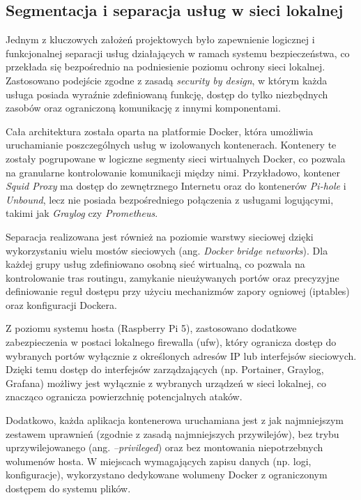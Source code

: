 \documentclass[
    left=2.5cm,         %
    right=2.5cm,        %
    top=2.5cm,          %
    bottom=3cm,         %
    bindingoffset=6mm,  %
    nohyphenation=true %
]{eiti/eiti-thesis} %
\begin{document}
\subsection{Segmentacja i separacja usług w sieci lokalnej}

Jednym z kluczowych założeń projektowych było zapewnienie logicznej i funkcjonalnej separacji usług działających w ramach systemu bezpieczeństwa, co przekłada się bezpośrednio na podniesienie poziomu ochrony sieci lokalnej. Zastosowano podejście zgodne z zasadą \textit{security by design}, w którym każda usługa posiada wyraźnie zdefiniowaną funkcję, dostęp do tylko niezbędnych zasobów oraz ograniczoną komunikację z innymi komponentami.

Cała architektura została oparta na platformie Docker\cite{docker-docs}, która umożliwia uruchamianie poszczególnych usług w izolowanych kontenerach. Kontenery te zostały pogrupowane w logiczne segmenty sieci wirtualnych Docker, co pozwala na granularne kontrolowanie komunikacji między nimi. Przykładowo, kontener \textit{Squid Proxy} ma dostęp do zewnętrznego Internetu oraz do kontenerów \textit{Pi-hole} i \textit{Unbound}, lecz nie posiada bezpośredniego połączenia z usługami logującymi, takimi jak \textit{Graylog} czy \textit{Prometheus}.

Separacja realizowana jest również na poziomie warstwy sieciowej dzięki wykorzystaniu wielu mostów sieciowych (ang. \textit{Docker bridge networks}). Dla każdej grupy usług zdefiniowano osobną sieć wirtualną, co pozwala na kontrolowanie tras routingu, zamykanie nieużywanych portów oraz precyzyjne definiowanie reguł dostępu przy użyciu mechanizmów zapory ogniowej (iptables) oraz konfiguracji Dockera.

Z poziomu systemu hosta (Raspberry Pi 5), zastosowano dodatkowe zabezpieczenia w postaci lokalnego firewalla (ufw), który ogranicza dostęp do wybranych portów wyłącznie z określonych adresów IP lub interfejsów sieciowych. Dzięki temu dostęp do interfejsów zarządzających (np. Portainer, Graylog, Grafana) możliwy jest wyłącznie z wybranych urządzeń w sieci lokalnej, co znacząco ogranicza powierzchnię potencjalnych ataków.

Dodatkowo, każda aplikacja kontenerowa uruchamiana jest z jak najmniejszym zestawem uprawnień (zgodnie z zasadą najmniejszych przywilejów), bez trybu uprzywilejowanego (ang. \textit{--privileged}) oraz bez montowania niepotrzebnych wolumenów hosta. W miejscach wymagających zapisu danych (np. logi, konfiguracje), wykorzystano dedykowane wolumeny Docker z ograniczonym dostępem do systemu plików.
\end{document}
